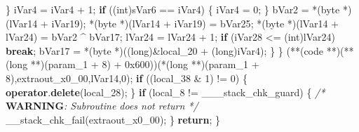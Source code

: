 \documentclass[
]{article}
\newenvironment{Shaded}{}{}
\newcommand{\AlertTok}[1]{\textcolor[rgb]{1.00,0.00,0.00}{\textbf{#1}}}
\newcommand{\BaseNTok}[1]{\textcolor[rgb]{0.25,0.63,0.44}{#1}}
\newcommand{\CommentTok}[1]{\textcolor[rgb]{0.38,0.63,0.69}{\textit{#1}}}
\newcommand{\ControlFlowTok}[1]{\textcolor[rgb]{0.00,0.44,0.13}{\textbf{#1}}}
\newcommand{\DataTypeTok}[1]{\textcolor[rgb]{0.56,0.13,0.00}{#1}}
\newcommand{\DecValTok}[1]{\textcolor[rgb]{0.25,0.63,0.44}{#1}}
\newcommand{\KeywordTok}[1]{\textcolor[rgb]{0.00,0.44,0.13}{\textbf{#1}}}
\newcommand{\NormalTok}[1]{#1}
\newcommand{\OperatorTok}[1]{\textcolor[rgb]{0.40,0.40,0.40}{#1}}
\begin{document}
\begin{Shaded}
\begin{Highlighting}[]
      \OperatorTok{\}}
\NormalTok{      iVar4 }\OperatorTok{=}\NormalTok{ iVar4 }\OperatorTok{+} \DecValTok{1}\OperatorTok{;}
      \ControlFlowTok{if} \OperatorTok{((}\DataTypeTok{int}\OperatorTok{)}\NormalTok{sVar6 }\OperatorTok{==}\NormalTok{ iVar4}\OperatorTok{)} \OperatorTok{\{}
\NormalTok{        iVar4 }\OperatorTok{=} \DecValTok{0}\OperatorTok{;}
      \OperatorTok{\}}
\NormalTok{      bVar2 }\OperatorTok{=} \OperatorTok{*(}\NormalTok{byte }\OperatorTok{*)(}\NormalTok{lVar14 }\OperatorTok{+}\NormalTok{ iVar19}\OperatorTok{);}
      \OperatorTok{*(}\NormalTok{byte }\OperatorTok{*)(}\NormalTok{lVar14 }\OperatorTok{+}\NormalTok{ iVar19}\OperatorTok{)} \OperatorTok{=}\NormalTok{ bVar25}\OperatorTok{;}
      \OperatorTok{*(}\NormalTok{byte }\OperatorTok{*)(}\NormalTok{lVar14 }\OperatorTok{+}\NormalTok{ lVar24}\OperatorTok{)} \OperatorTok{=}\NormalTok{ bVar2 }\OperatorTok{\^{}}\NormalTok{ bVar17}\OperatorTok{;}
\NormalTok{      lVar24 }\OperatorTok{=}\NormalTok{ lVar24 }\OperatorTok{+} \DecValTok{1}\OperatorTok{;}
      \ControlFlowTok{if} \OperatorTok{(}\NormalTok{iVar28 }\OperatorTok{\textless{}=} \OperatorTok{(}\DataTypeTok{int}\OperatorTok{)}\NormalTok{lVar24}\OperatorTok{)} \ControlFlowTok{break}\OperatorTok{;}
\NormalTok{      bVar17 }\OperatorTok{=} \OperatorTok{*(}\NormalTok{byte }\OperatorTok{*)((}\DataTypeTok{long}\OperatorTok{)\&}\NormalTok{local\_20 }\OperatorTok{+} \OperatorTok{(}\DataTypeTok{long}\OperatorTok{)}\NormalTok{iVar4}\OperatorTok{);}
    \OperatorTok{\}}
  \OperatorTok{\}}
  \OperatorTok{(**(}\NormalTok{code }\OperatorTok{**)(**(}\DataTypeTok{long} \OperatorTok{**)(}\NormalTok{param\_1 }\OperatorTok{+} \DecValTok{8}\OperatorTok{)} \OperatorTok{+} \BaseNTok{0x600}\OperatorTok{))(*(}\DataTypeTok{long} \OperatorTok{**)(}\NormalTok{param\_1 }\OperatorTok{+} \DecValTok{8}\OperatorTok{),}\NormalTok{extraout\_x0\_00}\OperatorTok{,}\NormalTok{lVar14}\OperatorTok{,}\DecValTok{0}\OperatorTok{);}
  \ControlFlowTok{if} \OperatorTok{((}\NormalTok{local\_38 }\OperatorTok{\&} \DecValTok{1}\OperatorTok{)} \OperatorTok{!=} \DecValTok{0}\OperatorTok{)} \OperatorTok{\{}
    \KeywordTok{operator}\OperatorTok{.}\KeywordTok{delete}\OperatorTok{(}\NormalTok{local\_28}\OperatorTok{);}
  \OperatorTok{\}}
  \ControlFlowTok{if} \OperatorTok{(}\NormalTok{local\_8 }\OperatorTok{!=}\NormalTok{ \_\_\_stack\_chk\_guard}\OperatorTok{)} \OperatorTok{\{}
                    \CommentTok{/* }\AlertTok{WARNING}\CommentTok{: Subroutine does not return */}
\NormalTok{    \_\_stack\_chk\_fail}\OperatorTok{(}\NormalTok{extraout\_x0\_00}\OperatorTok{);}
  \OperatorTok{\}}
  \ControlFlowTok{return}\OperatorTok{;}
\OperatorTok{\}}
\end{Highlighting}
\end{Shaded}
\end{document}
